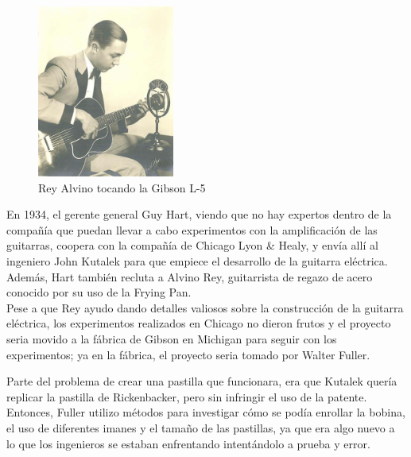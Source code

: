 \documentclass{article}
\begin{document}
\begin{figure}
    \centering
    \includegraphics[width=0.4\textwidth]{images/rey_alvino.jpg}
    \vspace{-5pt}
    \caption{Rey Alvino tocando la Gibson L-5}
\end{figure}

En 1934, el gerente general Guy Hart, viendo que no hay expertos dentro de la compañía que puedan llevar a cabo experimentos con la amplificación de las guitarras, coopera con la compañía de Chicago Lyon \& Healy, y envía allí al ingeniero John Kutalek para que empiece el desarrollo de la guitarra eléctrica. Además, Hart también recluta a Alvino Rey, guitarrista de regazo de acero conocido por su uso de la Frying Pan.\\

Pese a que Rey ayudo dando detalles valiosos sobre la construcción de la guitarra eléctrica, los experimentos realizados en Chicago no dieron frutos y el proyecto seria movido a la fábrica de Gibson en Michigan para seguir con los experimentos; ya en la fábrica, el proyecto seria tomado por Walter Fuller.\\

\endgroup

Parte del problema de crear una pastilla que funcionara, era que Kutalek quería replicar la pastilla de Rickenbacker, pero sin infringir el uso de la patente. Entonces, Fuller utilizo métodos para investigar cómo se podía enrollar la bobina, el uso de diferentes imanes y el tamaño de las pastillas, ya que era algo nuevo a lo que los ingenieros se estaban enfrentando intentándolo a prueba y error.\\

\begingroup
\setlength{\intextsep}{0pt}%
\setlength{\columnsep}{0pt}%
\end{document}
